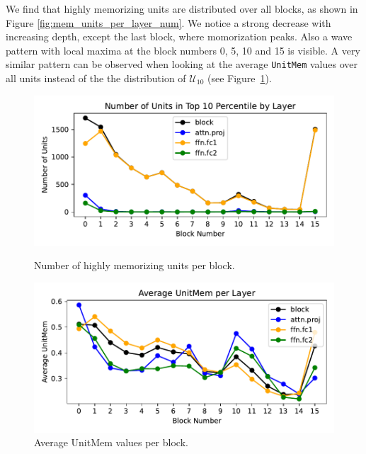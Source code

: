 \documentclass{article} %
\begin{document}
We find that highly memorizing units are distributed over all blocks, as shown in Figure \ref{fig:mem_units_per_layer_num}.
We notice a strong decrease with increasing depth, except the last block, where momorization peaks.
Also a wave pattern with local maxima at the block numbers 0, 5, 10 and 15 is visible.
A very similar pattern can be observed when looking at the average \texttt{UnitMem} values over all units instead of the the distribution of $\mathcal{U}_{10}$ (see Figure~\ref{fig:mem_avg_per_layer_num}).
\begin{figure}[ht]
   \centering
   \begin{minipage}{0.48\textwidth}
      \centering
      \includegraphics[width=\textwidth]{figures/mem_units_per_layer_num.pdf}
      \caption{Number of highly memorizing units per block.}
      \label{fig:mem_units_per_layer_num}
   \end{minipage}\hfill
   \begin{minipage}{0.48\textwidth}
      \centering
      \includegraphics[width=\textwidth]{figures/mem_avg_per_layer_num.pdf}
      \caption{Average UnitMem values per block.}
      \label{fig:mem_avg_per_layer_num}
   \end{minipage}
\end{figure}
\end{document}
